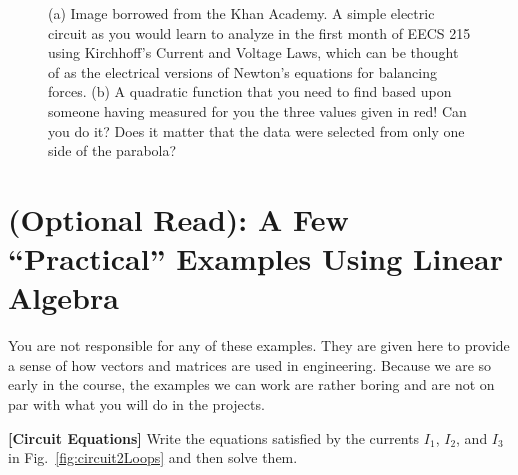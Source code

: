 \vspace*{.2cm} 
\begin{figure}[t!]
\centering
{}%
\hspace{5pt}%
%
\caption{(a) Image borrowed from the Khan Academy. A simple electric circuit as you would learn to analyze in the first month of EECS 215 using Kirchhoff's Current and Voltage Laws, which can be thought of as the electrical versions of Newton's equations for balancing forces. (b) A quadratic function that you need to find based upon someone having measured for you the three values given in red! Can you do it? Does it matter that the data were selected from only one side of the parabola?}
\label{fig:ResistorNetworkLoopMethodKahnAcademy}
\end{figure}

\section{(Optional Read): A Few ``Practical'' Examples Using Linear Algebra}
You are not responsible for any of these examples. They are given here to provide a sense of how vectors and matrices are used in engineering. Because we are so early in the course, the examples we can work are rather boring and are not on par with what you will do in the projects. 

\begin{example}
\label{ex:CircuitEqualtions}
\textbf{[Circuit Equations]} 
Write the equations satisfied by the currents $I_1$, $I_2$, and $I_3$ in Fig.~\ref{fig:circuit2Loops} and then solve them. 
\end{example}




